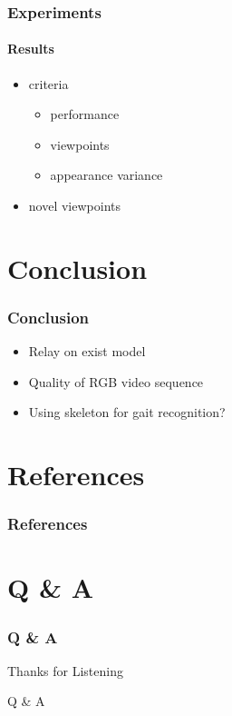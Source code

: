 \documentclass[
	11pt, %
	aspectratio=169, %
]{beamer}
\begin{document}
\begin{frame}
	\frametitle{Experiments}
	\framesubtitle{Results}

	\begin{itemize}
		\item criteria
		\begin{itemize}
			\item performance
			\item viewpoints
			\item appearance variance
		\end{itemize}
		\item novel viewpoints
	\end{itemize}
\end{frame}


\section{Conclusion}

\begin{frame}
	\frametitle{Conclusion}

	\begin{itemize}
		\item Relay on exist model
		\item Quality of RGB video sequence
		\item Using skeleton for gait recognition?
	\end{itemize}
\end{frame}


\section{References}

\begin{frame}
	\frametitle{References}

	\printbibliography
\end{frame}


\section{Q \& A}

\begin{frame}
    \frametitle{Q \& A}
	\begin{center}
		{\Huge Thanks for Listening}
		
		\bigskip\bigskip %
		
		{\LARGE Q \& A}

	\end{center}
\end{frame}

\end{document}
